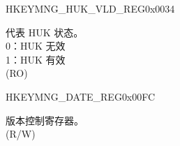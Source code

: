 \begin{register}{H}{KEYMNG\_HUK\_VLD\_REG}{0x0034}\label{regdesc:KEYMNGHUKVLDREG}
%
%
\regnewline%
\begin{regdesc}\begin{reglist}
\label{fielddesc:KEYMNGHUKVALID}\item [KEYMNG\_HUK\_VALID] 代表 HUK 状态。\\
0：HUK 无效\\
1：HUK 有效\\
(RO)
\end{reglist}\end{regdesc}
\end{register}


\begin{register}{H}{KEYMNG\_DATE\_REG}{0x00FC}\label{regdesc:KEYMNGDATEREG}
%
%
\regnewline%
\begin{regdesc}\begin{reglist}
\label{fielddesc:KEYMNGDATE}\item [KEYMNG\_DATE] 版本控制寄存器。\\
(R/W)
\end{reglist}\end{regdesc}
\end{register}


